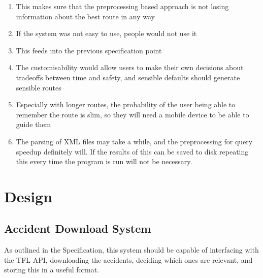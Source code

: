 \documentclass[11pt,twoside,a4paper]{article}
\begin{document}
\begin{enumerate}
\begin{enumerate}
        \item This makes sure that the preprocessing based approach is not losing information about the best route in any way
        \item If the system was not easy to use, people would not use it
        \item This feeds into the previous specification point
        \item The customisability would allow users to make their own decisions about tradeoffs between time and safety, and sensible defaults should generate sensible routes
        \item Especially with longer routes, the probability of the user being able to remember the route is slim, so they will need a mobile device to be able to guide them
        \item The parsing of XML files may take a while, and the preprocessing for query speedup definitely will. If the results of this can be saved to disk repeating this every time the program is run will not be necessary.
    \end{enumerate}
\end{enumerate}
\newpage
\section{Design}
\subsection{Accident Download System}
As outlined in the Specification, this system should be capable of interfacing with the TFL API, downloading the accidents, deciding which ones are relevant, and storing this in a useful format.
\end{document}
